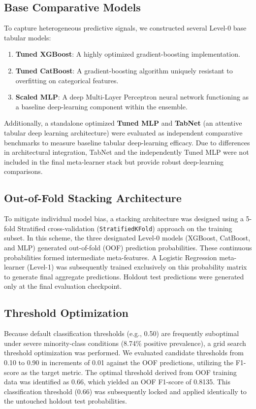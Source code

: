 \documentclass[conference]{IEEEtran}
\begin{document}
\subsection{Base Comparative Models}
To capture heterogeneous predictive signals, we constructed several Level-0 base tabular models:
\begin{enumerate}
\item \textbf{Tuned XGBoost}: A highly optimized gradient-boosting implementation.
\item \textbf{Tuned CatBoost}: A gradient-boosting algorithm uniquely resistant to overfitting on categorical features.
\item \textbf{Scaled MLP}: A deep Multi-Layer Perceptron neural network functioning as a baseline deep-learning component within the ensemble.
\end{enumerate}


Additionally, a standalone optimized \textbf{Tuned MLP} and \textbf{TabNet} (an attentive tabular deep learning architecture) were evaluated as independent comparative benchmarks to measure baseline tabular deep-learning efficacy. Due to differences in architectural integration, TabNet and the independently Tuned MLP were not included in the final meta-learner stack but provide robust deep-learning comparisons.


\subsection{Out-of-Fold Stacking Architecture}
To mitigate individual model bias, a stacking architecture was designed using a 5-fold Stratified cross-validation (\texttt{StratifiedKFold}) approach on the training subset. In this scheme, the three designated Level-0 models (XGBoost, CatBoost, and MLP) generated out-of-fold (OOF) prediction probabilities. These continuous probabilities formed intermediate meta-features. A Logistic Regression meta-learner (Level-1) was subsequently trained exclusively on this probability matrix to generate final aggregate predictions. Holdout test predictions were generated only at the final evaluation checkpoint.


\subsection{Threshold Optimization}
Because default classification thresholds (e.g., 0.50) are frequently suboptimal under severe minority-class conditions (8.74\% positive prevalence), a grid search threshold optimization was performed. We evaluated candidate thresholds from 0.10 to 0.90 in increments of 0.01 against the OOF predictions, utilizing the F1-score as the target metric. The optimal threshold derived from OOF training data was identified as 0.66, which yielded an OOF F1-score of 0.8135. This classification threshold (0.66) was subsequently locked and applied identically to the untouched holdout test probabilities.
\end{document}
